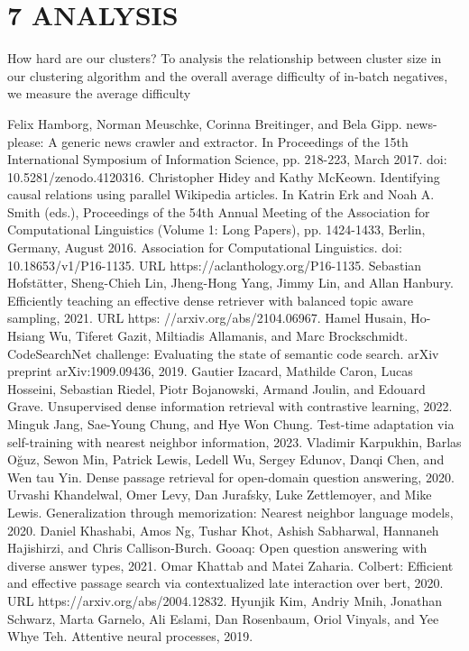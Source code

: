 \section*{7 ANALYSIS}
How hard are our clusters? To analysis the relationship between cluster size in our clustering algorithm and the overall average difficulty of in-batch negatives, we measure the average difficulty

Felix Hamborg, Norman Meuschke, Corinna Breitinger, and Bela Gipp. news-please: A generic news crawler and extractor. In Proceedings of the 15th International Symposium of Information Science, pp. 218-223, March 2017. doi: 10.5281/zenodo.4120316.
Christopher Hidey and Kathy McKeown. Identifying causal relations using parallel Wikipedia articles. In Katrin Erk and Noah A. Smith (eds.), Proceedings of the 54th Annual Meeting of the Association for Computational Linguistics (Volume 1: Long Papers), pp. 1424-1433, Berlin, Germany, August 2016. Association for Computational Linguistics. doi: 10.18653/v1/P16-1135. URL https://aclanthology.org/P16-1135.
Sebastian Hofstätter, Sheng-Chieh Lin, Jheng-Hong Yang, Jimmy Lin, and Allan Hanbury. Efficiently teaching an effective dense retriever with balanced topic aware sampling, 2021. URL https: //arxiv.org/abs/2104.06967.
Hamel Husain, Ho-Hsiang Wu, Tiferet Gazit, Miltiadis Allamanis, and Marc Brockschmidt. CodeSearchNet challenge: Evaluating the state of semantic code search. arXiv preprint arXiv:1909.09436, 2019.
Gautier Izacard, Mathilde Caron, Lucas Hosseini, Sebastian Riedel, Piotr Bojanowski, Armand Joulin, and Edouard Grave. Unsupervised dense information retrieval with contrastive learning, 2022.
Minguk Jang, Sae-Young Chung, and Hye Won Chung. Test-time adaptation via self-training with nearest neighbor information, 2023.
Vladimir Karpukhin, Barlas Oğuz, Sewon Min, Patrick Lewis, Ledell Wu, Sergey Edunov, Danqi Chen, and Wen tau Yin. Dense passage retrieval for open-domain question answering, 2020.
Urvashi Khandelwal, Omer Levy, Dan Jurafsky, Luke Zettlemoyer, and Mike Lewis. Generalization through memorization: Nearest neighbor language models, 2020.
Daniel Khashabi, Amos Ng, Tushar Khot, Ashish Sabharwal, Hannaneh Hajishirzi, and Chris Callison-Burch. Gooaq: Open question answering with diverse answer types, 2021.
Omar Khattab and Matei Zaharia. Colbert: Efficient and effective passage search via contextualized late interaction over bert, 2020. URL https://arxiv.org/abs/2004.12832.
Hyunjik Kim, Andriy Mnih, Jonathan Schwarz, Marta Garnelo, Ali Eslami, Dan Rosenbaum, Oriol Vinyals, and Yee Whye Teh. Attentive neural processes, 2019.
